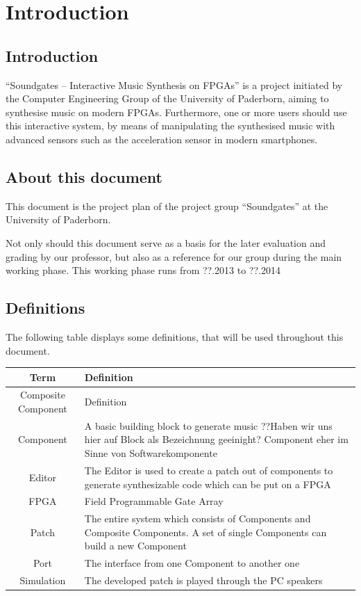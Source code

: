 \chapter{Introduction}
	\label{chapter:Introduction}
	\section{Introduction}
	
"`Soundgates – Interactive Music Synthesis on FPGAs"' is a project initiated by the Computer Engineering Group of the University of Paderborn, aiming to synthesise music on modern FPGAs. 
Furthermore, one or more users should use this interactive system, by means of manipulating the synthesised music with advanced sensors such as the acceleration sensor in modern smartphones.
	

	
	
	\section{About this document}
	This document is the project plan of the project group ``Soundgates'' at the University of Paderborn. 
	

	Not only should this document serve as a basis for the later evaluation and grading by our professor, but also as a reference for our group during the main working phase.
	This working phase runs from ??.2013 to ??.2014
	\section{Definitions}
	 The following table displays some definitions, that will be used throughout this document.\\
	
	 \begin{tabular}[h]{|c|p{9.75cm}|}
	  \hline
	  Term & Definition \\
	  \hline
	  \hline
	  Composite Component & Definition \\\hline
	  Component & A basic building block to generate music ??Haben wir uns hier auf Block als Bezeichnung geeinight? Component eher im Sinne von Softwarekomponente\\\hline
	  Editor & The Editor is used to create a patch out of components to generate synthesizable code which can be put on a FPGA \\\hline
	  FPGA & Field Programmable Gate Array \\\hline
	  Patch & The entire system which consists of Components and Composite Components. A set of single Components can build a new Component \\\hline
	  Port & The interface from one Component to another one \\\hline
	  Simulation & The developed patch is played through the PC speakers \\\hline
	 \end{tabular}
	 

